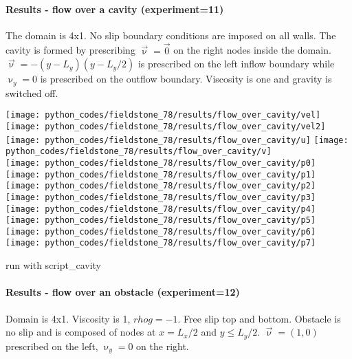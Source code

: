 \newpage
\paragraph{Results - flow over a cavity (experiment=11)}

The domain is 4x1. No slip boundary conditions are imposed on all walls.
The cavity is formed by prescribing $\vec{\upnu}=\vec{0}$ on the right
nodes inside the domain. $\vec{\upnu}=-(y-L_y)(y-L_y/2)$ is prescribed 
on the left inflow boundary while $\upnu_y=0$ is prescribed on the outflow boundary.
Viscosity is one and gravity is switched off.
 
\begin{center}
\texttt{[image: python\_codes/fieldstone\_78/results/flow\_over\_cavity/vel]}
\texttt{[image: python\_codes/fieldstone\_78/results/flow\_over\_cavity/vel2]}\\
\texttt{[image: python\_codes/fieldstone\_78/results/flow\_over\_cavity/u]}
\texttt{[image: python\_codes/fieldstone\_78/results/flow\_over\_cavity/v]}\\
\texttt{[image: python\_codes/fieldstone\_78/results/flow\_over\_cavity/p0]}
\texttt{[image: python\_codes/fieldstone\_78/results/flow\_over\_cavity/p1]}\\
\texttt{[image: python\_codes/fieldstone\_78/results/flow\_over\_cavity/p2]}
\texttt{[image: python\_codes/fieldstone\_78/results/flow\_over\_cavity/p3]}\\
\texttt{[image: python\_codes/fieldstone\_78/results/flow\_over\_cavity/p4]}
\texttt{[image: python\_codes/fieldstone\_78/results/flow\_over\_cavity/p5]}\\
\texttt{[image: python\_codes/fieldstone\_78/results/flow\_over\_cavity/p6]}
\texttt{[image: python\_codes/fieldstone\_78/results/flow\_over\_cavity/p7]}
\end{center}

run with script\_cavity




\newpage
\paragraph{Results - flow over an obstacle (experiment=12)}

Domain is 4x1. Viscosity is 1, $rho g = -1$. Free slip top and bottom.
Obstacle is no slip and is composed of nodes at $x=L_x/2$ and $y\le L_y/2$.
$\vec\upnu=(1,0)$ prescribed on the left, $\upnu_y=0$ on the right.

